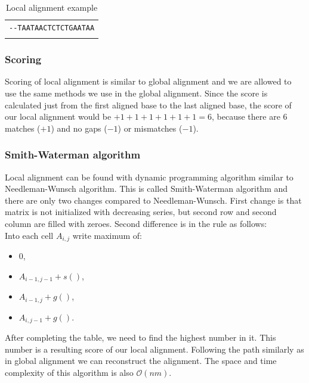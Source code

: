 \begin{table}
  \centering
	\begin{tabular}{ c }
	\verb|--TAATAACTCTCTGAATAA| \\
	\verb%     	|||||| 	% \\
	\verb|CGGCGGCGGTCTCTGCC---| \\
	\end{tabular}
  \caption{Local alignment example}
  \label{tab:loal}
\end{table}

\subsubsection{Scoring}
Scoring of local alignment is similar to global alignment and we are allowed to use the same methods we use in the global alignment.
Since the score is calculated just from the first aligned base to the last aligned base, the score of our local alignment would be $+1+1+1+1+1+1 = 6$, because there are 6 matches ($+1$) and no gaps ($-1$) or mismatches ($-1$).

\subsubsection{Smith-Waterman algorithm}
Local alignment can be found with dynamic programming algorithm similar to Needleman-Wunsch algorithm.
This is called Smith-Waterman algorithm and there are only two changes compared to Needleman-Wunsch.
First change is that matrix is not initialized with decreasing series, but second row and second column are filled with zeroes.
Second difference is in the rule as follows:\\
Into each cell $A_{i,j}$ write maximum of:
\begin{itemize}
\item $0$,
\item $A_{i-1, j-1} + s()$,
\item $A_{i-1, j} + g()$,
\item $A_{i, j-1} + g()$.
\end{itemize}
After completing the table, we need to find the highest number in it.
This number is a resulting score of our local alignment.
Following the path similarly as in global alignment we can reconstruct the alignment.
The space and time complexity of this algorithm is also $\mathcal{O}(nm)$.

